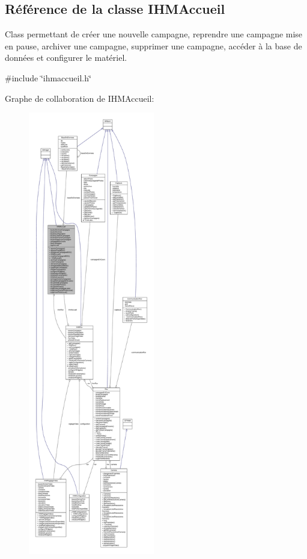 \hypertarget{class_i_h_m_accueil}{}\subsection{Référence de la classe I\+H\+M\+Accueil}
\label{class_i_h_m_accueil}


Class permettant de créer une nouvelle campagne, reprendre une campagne mise en pause, archiver une campagne, supprimer une campagne, accéder à la base de données et configurer le matériel.  




{\ttfamily \#include \char`\"{}ihmaccueil.\+h\char`\"{}}



Graphe de collaboration de I\+H\+M\+Accueil\+:
\nopagebreak
\begin{figure}[H]
\begin{center}
\leavevmode
\includegraphics[height=550pt]{class_i_h_m_accueil__coll__graph}
\end{center}
\end{figure}

